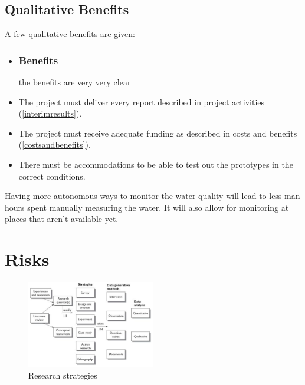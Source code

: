 \documentclass[11pt, a4paper]{article}
\begin{document}
\subsection{Qualitative Benefits}
A few qualitative benefits are given:




\begin{itemize}
  \item \subsubsection*{Benefits} the benefits are very very clear
  \item The project must deliver every report described in project activities (\ref{interimresults}).
  \item The project must receive adequate funding as described in costs and benefits (\ref{costsandbenefits}).
  \item There must be accommodations to be able to test out the prototypes in the correct conditions.
\end{itemize}



Having more autonomous ways to monitor the water quality will lead to less man hours spent manually measuring the water. It will also allow for monitoring at places that aren't available yet.



\section{Risks}

\begin{figure}[h]
    \center
    \includegraphics[width=0.5\textwidth]{research-strategies.png}
    \caption{Research strategies \cite{oates2005researching}}
    \label{fig:research_strategies}
\end{figure}

\printbibliography 
\pagebreak

\end{document}
